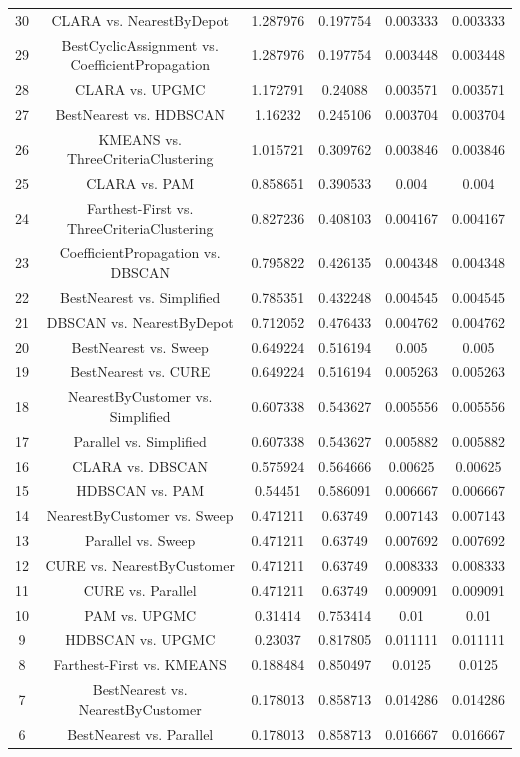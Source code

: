\documentclass[a4paper,10pt]{article}
\begin{document}
\begin{landscape}
\begin{table}[!htp]
\begin{tabular}{cccccc}
30&CLARA vs. NearestByDepot&1.287976&0.197754&0.003333&0.003333\\
29&BestCyclicAssignment vs. CoefficientPropagation&1.287976&0.197754&0.003448&0.003448\\
28&CLARA vs. UPGMC&1.172791&0.24088&0.003571&0.003571\\
27&BestNearest vs. HDBSCAN&1.16232&0.245106&0.003704&0.003704\\
26&KMEANS vs. ThreeCriteriaClustering&1.015721&0.309762&0.003846&0.003846\\
25&CLARA vs. PAM&0.858651&0.390533&0.004&0.004\\
24&Farthest-First vs. ThreeCriteriaClustering&0.827236&0.408103&0.004167&0.004167\\
23&CoefficientPropagation vs. DBSCAN&0.795822&0.426135&0.004348&0.004348\\
22&BestNearest vs. Simplified&0.785351&0.432248&0.004545&0.004545\\
21&DBSCAN vs. NearestByDepot&0.712052&0.476433&0.004762&0.004762\\
20&BestNearest vs. Sweep&0.649224&0.516194&0.005&0.005\\
19&BestNearest vs. CURE&0.649224&0.516194&0.005263&0.005263\\
18&NearestByCustomer vs. Simplified&0.607338&0.543627&0.005556&0.005556\\
17&Parallel vs. Simplified&0.607338&0.543627&0.005882&0.005882\\
16&CLARA vs. DBSCAN&0.575924&0.564666&0.00625&0.00625\\
15&HDBSCAN vs. PAM&0.54451&0.586091&0.006667&0.006667\\
14&NearestByCustomer vs. Sweep&0.471211&0.63749&0.007143&0.007143\\
13&Parallel vs. Sweep&0.471211&0.63749&0.007692&0.007692\\
12&CURE vs. NearestByCustomer&0.471211&0.63749&0.008333&0.008333\\
11&CURE vs. Parallel&0.471211&0.63749&0.009091&0.009091\\
10&PAM vs. UPGMC&0.31414&0.753414&0.01&0.01\\
9&HDBSCAN vs. UPGMC&0.23037&0.817805&0.011111&0.011111\\
8&Farthest-First vs. KMEANS&0.188484&0.850497&0.0125&0.0125\\
7&BestNearest vs. NearestByCustomer&0.178013&0.858713&0.014286&0.014286\\
6&BestNearest vs. Parallel&0.178013&0.858713&0.016667&0.016667\\

\end{tabular}
\end{table}
\end{landscape}
\end{document}
